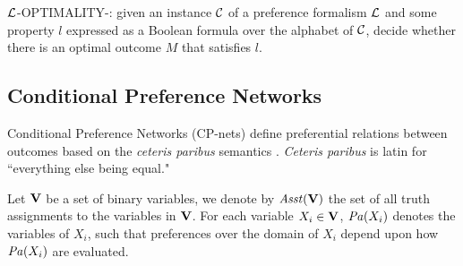 \begin{definition}
\label{def:opt3}
  $\mathcal{L}$-OPTIMALITY-: given an instance $\mathcal{C}$ of a preference
	formalism $\mathcal{L}$ and some property $l$ expressed as a Boolean formula 
	over the alphabet of $\mathcal{C}$,
  decide whether there is an optimal outcome $M$ that satisfies $l$.
\end{definition}



\subsection{Conditional Preference Networks}
Conditional Preference Networks (CP-nets) define preferential relations between outcomes
based on the \textit{ceteris paribus}
semantics \cite{bbdh03}.
\textit{Ceteris paribus} is latin for ``everything else being equal."

Let $\textbf{V}$ be a set of binary variables, we denote by $\mathit{Asst}(\textbf{V})$ the set of
all truth assignments to the variables in $\textbf{V}$.
For each variable $X_i \in \textbf{V}$, $\mathit{Pa}(X_i)$ denotes the  variables of
$X_i$, such that preferences over the domain of $X_i$ depend upon how
$\mathit{Pa}(X_i)$ are evaluated.
%
%

